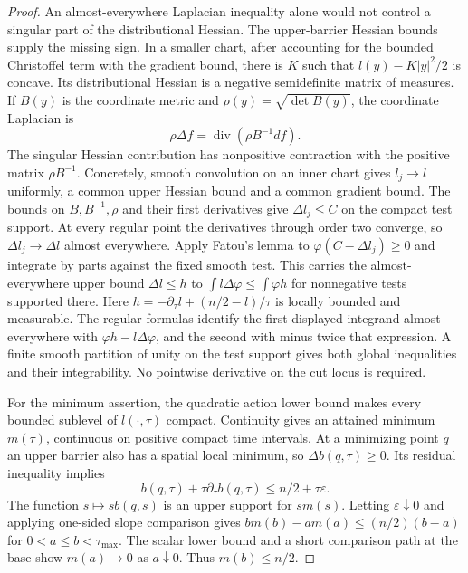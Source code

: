 \begin{proof}
An almost-everywhere Laplacian inequality alone would not control a singular
part of the distributional Hessian.  The upper-barrier Hessian bounds supply
the missing sign.  In a smaller chart, after accounting for the bounded
Christoffel term with the gradient bound, there is $K$ such that
$l(y)-K|y|^2/2$ is concave.  Its distributional Hessian is a negative
semidefinite matrix of measures.  If $B(y)$ is the coordinate metric and
$\rho(y)=\sqrt{\det B(y)}$, the coordinate Laplacian is
\[
 \rho\Delta f=\operatorname{div}(\rho B^{-1}df).
\]
The singular Hessian contribution has nonpositive contraction with the
positive matrix $\rho B^{-1}$.  Concretely, smooth convolution on an inner
chart gives $l_j\to l$ uniformly, a common upper Hessian bound and a common
gradient bound.  The bounds on $B,B^{-1},\rho$ and their first derivatives
give $\Delta l_j\leq C$ on the compact test support.  At every regular
point the derivatives through order two converge, so
$\Delta l_j\to\Delta l$ almost everywhere.  Apply Fatou's lemma to
$\varphi(C-\Delta l_j)\geq0$ and integrate by parts against the fixed
smooth test.  This carries the almost-everywhere upper bound $\Delta l\leq h$ to
$\int l\Delta\varphi\leq\int\varphi h$ for nonnegative tests supported
there.  Here $h=-\partial_\tau l+(n/2-l)/\tau$ is locally bounded and
measurable.  The regular formulas identify the first displayed integrand
almost everywhere with $\varphi h-l\Delta\varphi$, and the second with
minus twice that expression.  A finite smooth partition of unity on the
test support gives both global inequalities and their integrability.
No pointwise derivative on the cut locus is required.

For the minimum assertion, the quadratic action lower bound makes every
bounded sublevel of $l(\cdot,\tau)$ compact.  Continuity gives an attained
minimum $m(\tau)$, continuous on positive compact time intervals.
At a minimizing point $q$ an upper barrier also has a spatial local minimum,
so $\Delta b(q,\tau)\geq0$.  Its residual inequality implies
\[
 b(q,\tau)+\tau\partial_\tau b(q,\tau)
       \leq n/2+\tau\varepsilon.
\]
The function $s\mapsto s b(q,s)$ is an upper support for $s m(s)$.
Letting $\varepsilon\downarrow0$ and applying one-sided slope comparison
gives $b m(b)-a m(a)\leq(n/2)(b-a)$ for $0<a\leq b<\tau_{\max}$.
The scalar lower bound and a short comparison path at the base show
$m(a)\to0$ as $a\downarrow0$.  Thus $m(b)\leq n/2$.


\end{proof}
